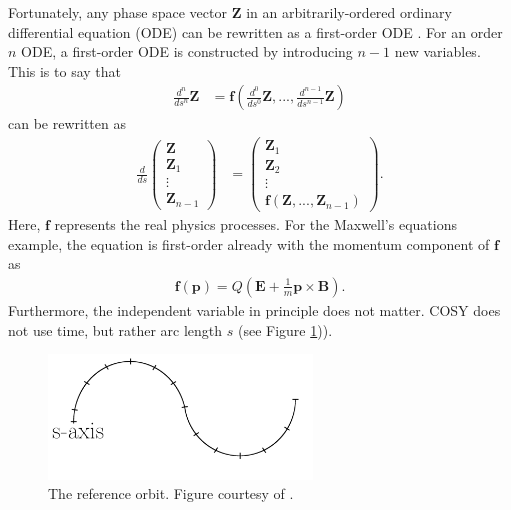 Fortunately, any phase space vector $\mathbf{Z}$ in an arbitrarily-ordered ordinary differential equation (ODE) can be rewritten as a first-order ODE \cite{modernMapMethods}. For an order $n$ ODE, a first-order ODE is constructed by introducing $n-1$ new variables. This is to say that
\begin{align} \nonumber
\frac{d^n}{ds^n}\mathbf{Z}&=\mathbf{f}(\frac{d^0}{ds^0}\mathbf{Z},...,\frac{d^{n-1}}{ds^{n-1}}\mathbf{Z})
\end{align}
can be rewritten as
\begin{align} \nonumber
\frac{d}{ds} \begin{pmatrix}
		\mathbf{Z} \\ \mathbf{Z}_1 \\ \vdots \\ \mathbf{Z}_{n-1}
		\end{pmatrix}
&= 		\begin{pmatrix}
		\mathbf{Z}_1 \\ \mathbf{Z}_2 \\ \vdots \\ \mathbf{f}(\mathbf{Z},...,\mathbf{Z}_{n-1})
		\end{pmatrix}.
\end{align}
Here, $\mathbf{f}$ represents the real physics processes. For the Maxwell's equations example, the equation is first-order already with the momentum component of $\mathbf{f}$ as
\begin{align}\nonumber
\mathbf{f}(\mathbf{p})=Q(\mathbf{E}+\frac{1}{m}\mathbf{p}\times\mathbf{B}).
\end{align}
 Furthermore, the independent variable in principle does not matter. COSY does not use time, but rather arc length $s$ (see Figure \ref{fig:saxis})).

\begin{figure}[h!]
\centering
\includegraphics*[width=70mm]{./Figures/saxis}
\caption{The reference orbit. Figure courtesy of \cite{berzFullnotes}.}
\label{fig:saxis}
\end{figure}

